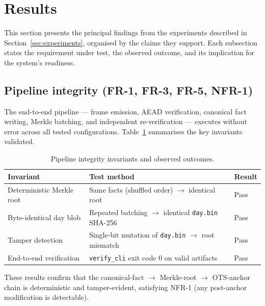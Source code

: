 \section{Results}
\label{sec:results}

This section presents the principal findings from the experiments
described in Section~\ref{sec:experiments}, organised by the claims
they support.
Each subsection states the requirement under test, the
observed outcome, and its implication for the system's readiness.

\subsection{Pipeline integrity (FR-1, FR-3, FR-5, NFR-1)}

The end-to-end pipeline — frame emission, \ac{AEAD} verification,
canonical fact writing, Merkle batching, and independent
re-verification — executes without error across all tested
configurations.
Table~\ref{tab:pipeline-summary} summarises the
key invariants validated.

\begin{table}[H]
    \centering
    \caption{Pipeline integrity invariants and observed outcomes.}
    \label{tab:pipeline-summary}
    \small
    \begin{tabularx}{\textwidth}{l X l}
\toprule
\textbf{Invariant} & \textbf{Test method} & \textbf{Result} \\
\midrule
Deterministic Merkle root   & Same facts (shuffled order) $\rightarrow$ identical root
& Pass \\
Byte-identical day blob     & Repeated batching $\rightarrow$ identical \texttt{day.bin} \ac{SHA}-256
& Pass \\
Tamper detection            & Single-bit mutation of \texttt{day.bin} $\rightarrow$ root mismatch
& Pass \\
End-to-end verification     & \texttt{verify\_cli} exit code 0 on valid artifacts
& Pass \\
\bottomrule
    \end{tabularx}
\end{table}

These results confirm that the canonical-fact $\rightarrow$
Merkle-root $\rightarrow$ \ac{OTS}-anchor chain is deterministic and
tamper-evident, satisfying NFR-1 (any post-anchor modification is
detectable).

